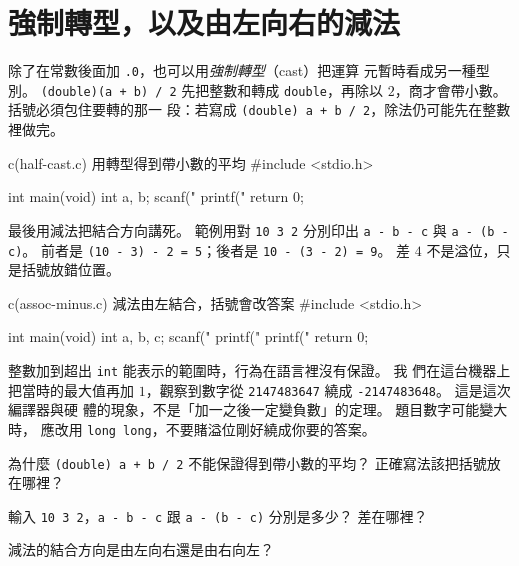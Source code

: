 \section{強制轉型，以及由左向右的減法}
\label{sec:float-cast-assoc}

除了在常數後面加 \texttt{.0}，也可以用\emph{強制轉型}（cast）把運算
元暫時看成另一種型別。 \texttt{(double)(a + b) / 2} 先把整數和轉成
\texttt{double}，再除以 $2$，商才會帶小數。 括號必須包住要轉的那一
段：若寫成 \texttt{(double) a + b / 2}，除法仍可能先在整數裡做完。

\begin{example}{c}{(half-cast.c) 用轉型得到帶小數的平均}
#include <stdio.h>

int main(void) {
    int a, b;
    scanf("%
    printf("%
    return 0;
}
\end{example}


最後用減法把結合方向講死。 範例用對 \texttt{10 3 2}
分別印出 \texttt{a - b - c} 與 \texttt{a - (b - c)}。 前者是
\texttt{(10 - 3) - 2 = 5}；後者是 \texttt{10 - (3 - 2) = 9}。 差 $4$
不是溢位，只是括號放錯位置。

\begin{example}{c}{(assoc-minus.c) 減法由左結合，括號會改答案}
#include <stdio.h>

int main(void) {
    int a, b, c;
    scanf("%
    printf("%
    printf("%
    return 0;
}
\end{example}


整數加到超出 \texttt{int} 能表示的範圍時，行為在語言裡沒有保證。 我
們在這台機器上把當時的最大值再加 $1$，觀察到數字從
\texttt{2147483647} 繞成 \texttt{-2147483648}。 這是這次編譯器與硬
體的現象，不是「加一之後一定變負數」的定理。 題目數字可能變大時，
應改用 \texttt{long long}，不要賭溢位剛好繞成你要的答案。


\begin{drills}[label=drills:float-cast-assoc]
\item 為什麼 \texttt{(double) a + b / 2} 不能保證得到帶小數的平均？
正確寫法該把括號放在哪裡？
\item 輸入 \texttt{10 3 2}，\texttt{a - b - c} 跟 \texttt{a - (b - c)}
分別是多少？ 差在哪裡？
\item 減法的結合方向是由左向右還是由右向左？
\end{drills}


